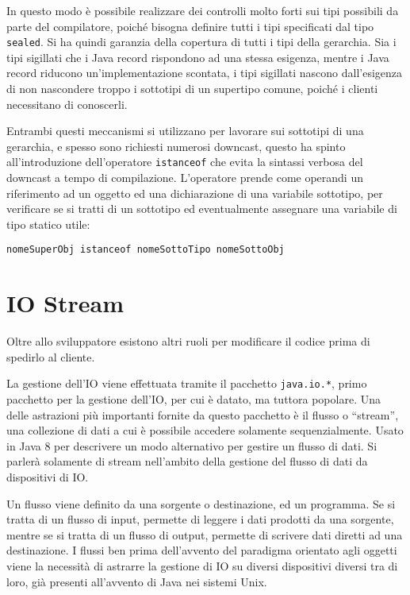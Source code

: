 \documentclass{article}
\numberwithin{equation}{subsection}
\begin{document}
In questo modo è possibile realizzare dei controlli molto forti sui tipi possibili da parte del compilatore, poiché bisogna definire tutti i tipi specificati dal tipo \verb|sealed|. 
Si ha quindi garanzia della copertura di tutti i tipi della gerarchia. 
Sia i tipi sigillati che i Java record rispondono ad una stessa esigenza, mentre i Java record riducono un'implementazione scontata, i tipi sigillati nascono dall'esigenza 
di non nascondere troppo i sottotipi di un supertipo comune, poiché i clienti necessitano di conoscerli. 


Entrambi questi meccanismi si utilizzano per lavorare sui sottotipi di una gerarchia, e spesso sono richiesti numerosi downcast, questo ha spinto all'introduzione dell'operatore \verb|istanceof| che evita la 
sintassi verbosa del downcast a tempo di compilazione. L'operatore prende come operandi un riferimento ad un oggetto ed una dichiarazione di una variabile sottotipo, per verificare se si tratti di un sottotipo 
ed eventualmente assegnare una variabile di tipo statico utile:
\begin{verbatim}
nomeSuperObj istanceof nomeSottoTipo nomeSottoObj
\end{verbatim}


\clearpage

\section{IO Stream}

Oltre allo sviluppatore esistono altri ruoli per modificare il codice prima di spedirlo al cliente. 

La gestione dell'IO viene effettuata tramite il pacchetto \verb|java.io.*|, primo pacchetto per la gestione dell'IO, per cui è datato, ma tuttora popolare. 
Una delle astrazioni più importanti fornite da questo pacchetto è il flusso o ``stream'', una collezione di dati a cui è possibile accedere solamente sequenzialmente. 
Usato in Java 8 per descrivere un modo alternativo per gestire un flusso di dati. 
Si parlerà solamente di stream nell'ambito della gestione del flusso di dati da dispositivi di IO. 

Un flusso viene definito da una sorgente o destinazione, ed un programma. Se si tratta di un flusso di input, permette di leggere i dati prodotti da una sorgente, mentre se si tratta di un 
flusso di output, permette di scrivere dati diretti ad una destinazione. 
I flussi ben prima dell'avvento del paradigma orientato agli oggetti viene la necessità di astrarre la gestione di IO su diversi dispositivi diversi tra di loro, già presenti 
all'avvento di Java nei sistemi Unix. 
\end{document}
